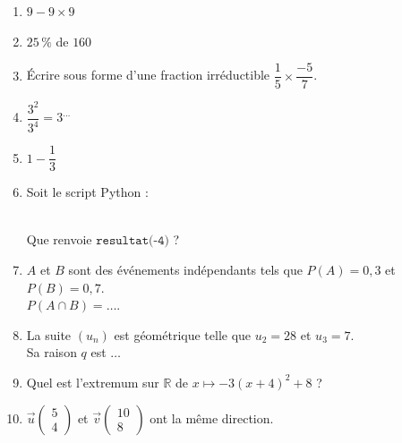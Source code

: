 \documentclass[a4paper,11pt,landscape,exos]{nsi} %
\begin{document}
\begin{multicols}{2}
\maketitle

\begin{enumerate}[]
    \item  $9-9\times9$
	\item $25\,\%$ de $160$
	\item Écrire sous forme d'une fraction irréductible $\dfrac{1}{5}\times \dfrac{-5}{7}$.
	\item $\dfrac{3^{2}}{3^{4}}=3^{\ldots}$
	\item $1-\dfrac{1}{3}$ 
	\item Soit le script Python : 

\medskip
\medskip\hspace*{10mm}\newline\medskip\\Que renvoie  $\texttt{resultat(-4)}$ ?
	\item $A$ et $B$ sont des événements indépendants tels que $P(A)=0{,}3$ et $P(B)=0{,}7$.
\\ $P(A\cap B)=\ldots$.
	\item La suite $(u_n)$ est géométrique telle que  $u_{2}= 28$ et $u_{3}= 7$.\\Sa raison $q$ est $\ldots$
	\item Quel est l'extremum sur $\mathbb{R}$ de  $x\longmapsto -3(x+4)^2+8$ ?  
	\item $\vec{u}\begin{pmatrix}5 \\4\end{pmatrix}$ et $\vec{v}\begin{pmatrix}10 \\ 8\end{pmatrix}$ ont la même direction. \\ 
    

\end{enumerate}
\end{multicols}
\end{document}

